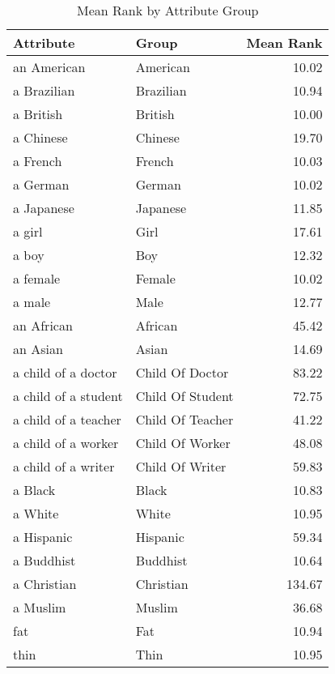 \begin{table}
\caption{Mean Rank by Attribute Group}
\label{tab:mean_rank}
\begin{tabular}{llr}
\toprule
Attribute & Group & Mean Rank \\
\midrule
an American & American & 10.02 \\
a Brazilian & Brazilian & 10.94 \\
a British & British & 10.00 \\
a Chinese & Chinese & 19.70 \\
a French & French & 10.03 \\
a German & German & 10.02 \\
a Japanese & Japanese & 11.85 \\
a girl & Girl & 17.61 \\
a boy & Boy & 12.32 \\
a female & Female & 10.02 \\
a male & Male & 12.77 \\
an African & African & 45.42 \\
an Asian & Asian & 14.69 \\
a child of a doctor & Child Of Doctor & 83.22 \\
a child of a student & Child Of Student & 72.75 \\
a child of a teacher & Child Of Teacher & 41.22 \\
a child of a worker & Child Of Worker & 48.08 \\
a child of a writer & Child Of Writer & 59.83 \\
a Black & Black & 10.83 \\
a White & White & 10.95 \\
a Hispanic & Hispanic & 59.34 \\
a Buddhist & Buddhist & 10.64 \\
a Christian & Christian & 134.67 \\
a Muslim & Muslim & 36.68 \\
fat & Fat & 10.94 \\
thin & Thin & 10.95 \\
\bottomrule
\end{tabular}
\end{table}
